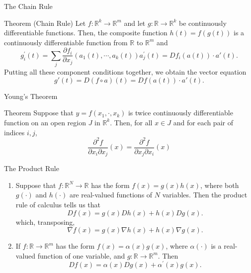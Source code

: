 \documentclass{beamer}
\begin{document}
\begin{frame}{The Chain Rule }
    \begin{block}{Theorem (Chain Rule)}
    Let $f:\mathbb{R}^k\to \mathbb{R}^m$ and let $g: \mathbb{R}\to \mathbb{R}^k$ be continuously differentiable functions. Then, the composite function $h(t)=f(g(t))$ is a continuously differentiable function from $\mathbb{R}$ to $\mathbb{R}^m$ and 
    \[g_i^\prime(t)=\sum_j\frac{\partial f_i}{\partial x_j}\left(a_1(t),\cdots,a_k(t)  \right)a_j^\prime (t)=Df_i(a(t))\cdot a'(t).
    \]
    Putting all these component conditions together, we obtain the vector equation
    \[g'(t)=D(f\circ a)(t)=Df(a(t))\cdot a'(t).
    \]
    \end{block}
\end{frame}
\begin{frame}{Young's Theorem}
\begin{block}{Theorem}
Suppose that $y=f(x_1,\cdot, x_k)$ is twice continuously differentiable function on an open region $J$ in $\mathbb{R}^k$. Then, for all $x\in J$ and for each pair of indices $i,j$,
\[\frac{\partial^2 f}{\partial x_i \partial x_j}(x)=\dfrac{\partial^2 f}{\partial x_j \partial x_i}(x)
\]
\end{block}

\end{frame}

\begin{frame}{The Product Rule }
    \begin{enumerate}
        \item Suppose that $f:\mathbb{R}^N\to \mathbb{R}$ has the form $f(x)=g(x)h(x)$, where both $g(\cdot) $ and $h(\cdot )$ are real-valued functions of $N$ variables. Then the product rule of calculus tells us that 
        \[Df(x)=g(x) Dh(x)+h(x)Dg(x).
        \]
        which, transposing, 
        \[\nabla f(x)=g(x) \nabla h(x)+h(x) \nabla g(x). 
        \]
        \item If  $f:\mathbb{R}\to \mathbb{R}^m$ has the form  $f(x)=\alpha(x)g(x)$, where $\alpha(\cdot )$ is a real-valued function of one variable, and $g:\mathbb{R}\to \mathbb{R}^m$. Then 
        \[Df(x)=\alpha(x)Dg(x)+\alpha^\prime (x)g(x).
        \]
    \end{enumerate}
\end{frame}
\end{document}
